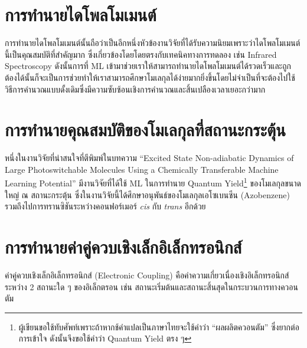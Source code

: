 \section{การทำนายไดโพลโมเมนต์}
\label{sec:pred_dipole_moment}

การทำนายไดโพลโมเมนต์นั้นถือว่าเป็นอีกหนึ่งหัวข้องานวิจัยที่ได้รับความนิยมเพราะว่าไดโพลโมเมนต์นี้เป็นคุณสมบัติที่สำคัญมาก ซึ่งเกี่ยวข้องโดยโดยตรงกับเทคนิคทางการทดลอง เช่น Infrared Spectroscopy ดังนั้นการที่ ML เข้ามาช่วยเราให้สามารถทำนายไดโพลโมเมนต์ได้รวดเร็วและถูกต้องได้นั้นก็จะเป็นการช่วยทำให้เราสามารถศึกษาโมเลกุลได้ง่ายมากยิ่งขึ้นโดยไม่จำเป็นที่จะต้องไปใช้วิธีการคำนวณแบบดั้งเดิมซึ่งมีความซับซ้อนเชิงการคำนวณและสิ้นเปลืองเวลาเยอะกว่ามาก\autocite{knijff2021,liu2020,pereira2018,staacke2022,sun2022,veit2020,vo2019}

\section{การทำนายคุณสมบัติของโมเลกุลที่สถานะกระตุ้น}
\label{sec:pred_ex_prop}

หนึ่งในงานวิจัยที่น่าสนใจที่ตีพิมพ์ในบทความ \enquote{Excited State Non-adiabatic Dynamics of Large Photoswitchable Molecules Using a Chemically Transferable Machine Learning Potential}\autocite{axelrod2022} มีงานวิจัยที่ได้ใช้ ML ในการทำนาย Quantum Yield\footnote{ผู้เขียนขอใช้ทับศัพท์เพราะถ้าหากช้คำแปลเป็นภาษาไทยจะใช้คำว่า \enquote{ผลผลิตควอนตัม} ซึ่งยากต่อการเข้าใจ ดังนั้นจึงขอใช้คำว่า Quantum Yield ตรง ๆ} ของโมเลกุลขนาดใหญ่ ณ สถานะกระตุ้น ซึ่งในงานวิจัยนี้ได้ศึกษาอนุพันธ์ของโมเลกุลเอโซเบนซีน (Azobenzene) รวมถึงไปการทรานซิชันระหว่างคอนฟอร์เมอร์ \textit{cis} กับ \textit{trans} อีกด้วย

\section{การทำนายค่าคู่ควบเชิงเล็กอิเล็กทรอนิกส์}
\label{sec:pred_elec_coupling}

ค่าคู่ควบเชิงเล็กอิเล็กทรอนิกส์ (Electronic Coupling) คือค่าความเกี่ยวเนื่องเชิงอิเล็กทรอนิกส์ระหว่าง 2 สถานะใด ๆ ของอิเล็กตรอน เช่น สถานะเริ่มต้นและสถานะสิ้นสุดในกระบวนการทางควอนตัม

